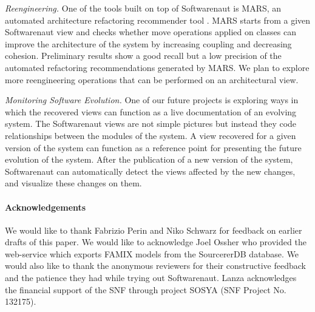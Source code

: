 \documentclass[preprint,12pt]{elsarticle}
\begin{document}
\begin{description}

\item {\em Reengineering.} One of the tools built on top of Softwarenaut is MARS, an automated architecture refactoring recommender tool \cite{boeckmann-mars}. MARS starts from a given Softwarenaut view and checks whether move operations applied on classes can improve the architecture of the system by increasing coupling and decreasing cohesion. Preliminary results show a good recall but a low precision of the automated refactoring recommendations generated by MARS. We plan to explore more reengineering operations that can be performed on an architectural view.

\item {\em Monitoring Software Evolution.} One of our future projects is exploring ways in which the recovered views can function as a live documentation of an evolving system. The Softwarenaut views are not simple pictures but instead they code relationships between the modules of the system. A view recovered for a given version of the system can function as a reference point for presenting the future evolution of the system. After the publication of a new version of the system, Softwarenaut can automatically detect the views affected by the new changes, and visualize these changes on them.

\end{description}

\paragraph{Acknowledgements} We would like to thank Fabrizio Perin and Niko Schwarz for feedback on earlier drafts of this paper. We would like to acknowledge Joel Ossher who provided the web-service which exports FAMIX models from the SourcererDB database. We would also like to thank the anonymous reviewers for their constructive feedback and the patience they had while trying out Softwarenaut. Lanza acknowledges the financial support of the SNF through project SOSYA (SNF Project No. 132175).



\end{document}
